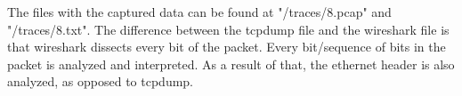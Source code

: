 The files with the captured data can be found at "/traces/8.pcap" and "/traces/8.txt".
The difference between the tcpdump file and the wireshark file is that wireshark dissects every bit of the packet. Every bit/sequence of bits in the packet is analyzed and interpreted. As a result of that, the ethernet header is also analyzed, as opposed to tcpdump.